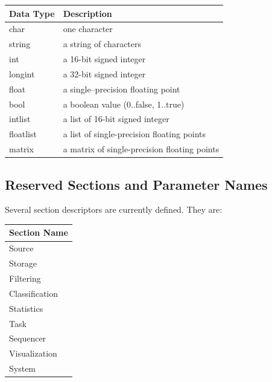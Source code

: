 \documentclass[letterpaper,oneside,12pt]{book}
\begin{document}
\begin{flushleft}

\begin{centering}
 \begin{tabular}{|l|l|}
  \hline
  \textbf{Data Type} & \textbf{Description} \\
  \hline
  char & one character \\
  \hline
  string & a string of characters \\
  \hline
  int & a 16-bit signed integer \\
  \hline
  longint & a 32-bit signed integer \\
  \hline
  float & a single--precision floating point \\
  \hline
  bool & a boolean value (0..false, 1..true) \\
  \hline
  intlist & a list of 16-bit signed integer \\
  \hline
  floatlist & a list of single-precision floating points \\
  \hline
  matrix & a matrix of single-precision floating points \\
  \hline
 \end{tabular}
\end{centering}   

\vspace{.5cm}

\newpage

\subsection{Reserved Sections and Parameter Names}

Several section descriptors are currently defined. They are:

\begin{flushleft}
 \begin{tabular}{|l|}
  \hline
  \textbf{Section Name}\\
  \hline
  Source \\
  \hline
  Storage \\
  \hline
  Filtering \\
  \hline
  Classification \\
  \hline
  Statistics \\
  \hline
  Task \\
  \hline
  Sequencer \\
  \hline
  Visualization \\
  \hline
  System \\
  \hline
 \end{tabular}
\end{flushleft}


\end{flushleft}
\end{document}
